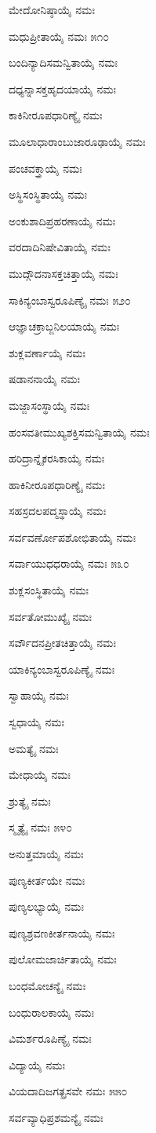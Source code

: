 ಮೇದೋನಿಷ್ಠಾಯೈ ನಮಃ

ಮಧುಪ್ರೀತಾಯೈ ನಮಃ \num{೫೧೦}

ಬಂದಿನ್ಯಾದಿಸಮನ್ವಿತಾಯೈ ನಮಃ

ದಧ್ಯನ್ನಾಸಕ್ತಹೃದಯಾಯೈ ನಮಃ

ಕಾಕಿನೀರೂಪಧಾರಿಣ್ಯೈ ನಮಃ

ಮೂಲಾಧಾರಾಂಬುಜಾರೂಢಾಯೈ ನಮಃ

ಪಂಚವಕ್ತ್ರಾಯೈ ನಮಃ

ಅಸ್ಥಿಸಂಸ್ಥಿತಾಯೈ ನಮಃ

ಅಂಕುಶಾದಿಪ್ರಹರಣಾಯೈ ನಮಃ

ವರದಾದಿನಿಷೇವಿತಾಯೈ ನಮಃ

ಮುದ್ಗೌದನಾಸಕ್ತಚಿತ್ತಾಯೈ ನಮಃ

ಸಾಕಿನ್ಯಂಬಾಸ್ವರೂಪಿಣ್ಯೈ ನಮಃ \num{೫೨೦}

ಆಜ್ಞಾಚಕ್ರಾಬ್ಜನಿಲಯಾಯೈ ನಮಃ

ಶುಕ್ಲವರ್ಣಾಯೈ ನಮಃ

ಷಡಾನನಾಯೈ ನಮಃ

ಮಜ್ಜಾಸಂಸ್ಥಾಯೈ ನಮಃ

ಹಂಸವತೀಮುಖ್ಯಶಕ್ತಿಸಮನ್ವಿತಾಯೈ ನಮಃ

ಹರಿದ್ರಾನ್ನೈಕರಸಿಕಾಯೈ ನಮಃ

ಹಾಕಿನೀರೂಪಧಾರಿಣ್ಯೈ ನಮಃ

ಸಹಸ್ರದಲಪದ್ಮಸ್ಥಾಯೈ ನಮಃ

ಸರ್ವವರ್ಣೋಪಶೋಭಿತಾಯೈ ನಮಃ

ಸರ್ವಾಯುಧಧರಾಯೈ ನಮಃ \num{೫೩೦}

ಶುಕ್ಲಸಂಸ್ಥಿತಾಯೈ ನಮಃ

ಸರ್ವತೋಮುಖ್ಯೈ ನಮಃ

ಸರ್ವೌದನಪ್ರೀತಚಿತ್ತಾಯೈ ನಮಃ

ಯಾಕಿನ್ಯಂಬಾಸ್ವರೂಪಿಣ್ಯೈ ನಮಃ

ಸ್ವಾಹಾಯೈ ನಮಃ

ಸ್ವಧಾಯೈ ನಮಃ

ಅಮತ್ಯೈ ನಮಃ

ಮೇಧಾಯೈ ನಮಃ

ಶ್ರುತ್ಯೈ ನಮಃ

ಸ್ಮೃತ್ಯೈ ನಮಃ \num{೫೪೦}

ಅನುತ್ತಮಾಯೈ ನಮಃ

ಪುಣ್ಯಕೀರ್ತಯೇ ನಮಃ

ಪುಣ್ಯಲಭ್ಯಾಯೈ ನಮಃ

ಪುಣ್ಯಶ್ರವಣಕೀರ್ತನಾಯೈ ನಮಃ

ಪುಲೋಮಜಾರ್ಚಿತಾಯೈ ನಮಃ

ಬಂಧಮೋಚನ್ಯೈ ನಮಃ

ಬಂಧುರಾಲಕಾಯೈ ನಮಃ

ವಿಮರ್ಶರೂಪಿಣ್ಯೈ ನಮಃ

ವಿದ್ಯಾಯೈ ನಮಃ

ವಿಯದಾದಿಜಗತ್ಪ್ರಸವೇ ನಮಃ \num{೫೫೦}

ಸರ್ವವ್ಯಾಧಿಪ್ರಶಮನ್ಯೈ ನಮಃ

